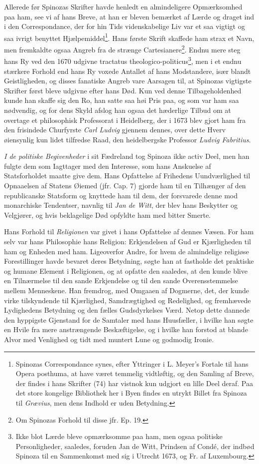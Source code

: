 \documentclass[12pt,a4paper]{book}
\newcommand{\opage}[1]{\marginnote{\footnotesize\textit{[#1]}}}
\begin{document}
Allerede før Spinozas Skrifter havde henledt en almindeligere
Opmærksomhed paa ham, see vi af hans Breve, at han er bleven bemærket af
Lærde og draget ind i den Correspondance, der for hin Tids videnskabelige
Liv var et saa vigtigt og saa ivrigt benyttet
Hjælpemiddel\footnote{Spinozas Correspondance synes, efter Yttringer i L.
Meyer's Fortale til hans Opera posthuma, at have været temmelig vidtløftig,
og den Samling af Breve, der findes i hans Skrifter (74) har vistnok kun
udgjort en lille Deel deraf. Paa det store kongelige Bibliothek her i Byen
findes en utrykt Billet fra Spinoza til \emph{Grævius}, men dens Indhold
er uden Betydning.}. Hans første Skrift skaffede ham strax et Navn, men
fremkaldte ogsaa Angreb fra de strænge Cartesianere\footnote{Om Spinozas
Forhold til disse jfr. Ep. 19.}. Endnu mere steg hans Ry ved den 1670
udgivne tractatus theologico-politicus\footnote{Ikke blot Lærde bleve
opmærksomme paa ham, men ogsaa politiske Personligheder, saaledes, foruden
Jan de Witt, Prindsen af Condé, der indbød Spinoza til en Sammenkomst med
sig i Utrecht 1673, og Fr. af Luxembourg.}, men i et endnu stærkere
Forhold end hans Ry voxede Antallet af hans Modstandere, især blandt
Geistligheden, og disses fanatiske Angreb vare Aarsagen til, at Spinozas
vigtigste Skrifter først bleve udgivne efter hans Død. Kun ved denne
Tilbageholdenhed kunde han skaffe sig den Ro, han satte saa høi Pris paa,
og som var ham saa nødvendig, og for dens Skyld afslog han ogsaa det
hæderlige Tilbud om at overtage et philosophisk Professorat i Heidelberg,
der i 1673 blev gjort ham fra den frisindede Churfyrste \emph{Carl
Ludvig} gjennem dennes, over dette Hverv øiensynlig kun
\opage{33} lidet tilfredse Raad, den heidelbergske Professor \emph{Ludvig
Fabritius}.

\emph{I de politiske Begivenheder} i sit Fædreland tog Spinoza ikke activ
Deel, men han fulgte dem som Iagttager med den Interesse, som hans
Anskuelse af Statsforholdet maatte give dem. Hans Opfattelse af Frihedens
Uundværlighed til Opnaaelsen af Statens Øiemed (jfr. Cap. 7) gjorde ham
til en Tilhænger af den republicanske Statsform og knyttede ham til dem,
der forsvarede denne mod monarchiske Tendentser, navnlig til \emph{Jan de
Witt}, der blev hans Beskytter og Velgjører, og hvis beklagelige Død
opfyldte ham med bitter Smerte.

Hans Forhold til \emph{Religionen} var givet i hans Opfattelse af dennes
Væsen. For ham selv var hans Philosophie hans Religion: Erkjendelsen af
Gud er Kjærligheden til ham og Enheden med ham. Ligeoverfor Andre, for
hvem de almindelige religiøse Forestillinger havde bevaret deres
Betydning, søgte han at fastholde det praktiske og humane Element i
Religionen, og at opfatte den saaledes, at den kunde blive en Tilnærmelse
til den sande Erkjendelse og til den sande Overensstemmelse mellem
Menneskene. Han fremdrog, med Omgaaen af Dogmerne, det, der kunde virke
tilskyndende til Kjærlighed, Samdrægtighed og Redelighed, og fremhævede
Lydighedens Betydning og den fælles Gudsdyrkelses Værd. Netop dette
dannede den hyppigste Gjenstand for de Samtaler med hans Huusfæller, i
hvilke han søgte en Hvile fra mere anstrængende Beskæftigelse, og i hvilke
han forstod at blande Alvor med Venlighed og tidt med muntert Lune og
godmodig Ironie.
\end{document}
